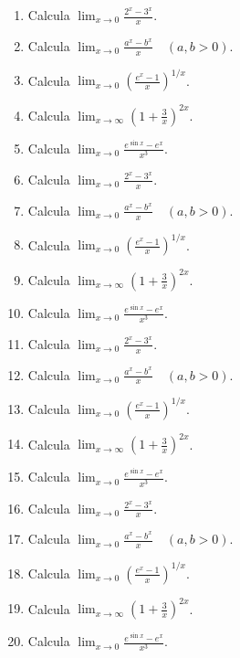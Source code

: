 \documentclass[11pt,a4paper]{article}
\begin{document}
\begin{enumerate}[label=\textbf{E\arabic*.},start=381]

\item Calcula $\displaystyle \lim_{x\to0}\frac{2^x-3^x}{x}$.

\item Calcula $\displaystyle \lim_{x\to0}\frac{a^x-b^x}{x}\quad(a,b>0)$.

\item Calcula $\displaystyle \lim_{x\to0}\left(\frac{e^x-1}{x}\right)^{1/x}$.

\item Calcula $\displaystyle \lim_{x\to\infty}\left(1+\frac{3}{x}\right)^{2x}$.

\item Calcula $\displaystyle \lim_{x\to0}\frac{e^{\sin x}-e^x}{x^3}$.

\item Calcula $\displaystyle \lim_{x\to0}\frac{2^x-3^x}{x}$.

\item Calcula $\displaystyle \lim_{x\to0}\frac{a^x-b^x}{x}\quad(a,b>0)$.

\item Calcula $\displaystyle \lim_{x\to0}\left(\frac{e^x-1}{x}\right)^{1/x}$.

\item Calcula $\displaystyle \lim_{x\to\infty}\left(1+\frac{3}{x}\right)^{2x}$.

\item Calcula $\displaystyle \lim_{x\to0}\frac{e^{\sin x}-e^x}{x^3}$.

\item Calcula $\displaystyle \lim_{x\to0}\frac{2^x-3^x}{x}$.

\item Calcula $\displaystyle \lim_{x\to0}\frac{a^x-b^x}{x}\quad(a,b>0)$.

\item Calcula $\displaystyle \lim_{x\to0}\left(\frac{e^x-1}{x}\right)^{1/x}$.

\item Calcula $\displaystyle \lim_{x\to\infty}\left(1+\frac{3}{x}\right)^{2x}$.

\item Calcula $\displaystyle \lim_{x\to0}\frac{e^{\sin x}-e^x}{x^3}$.

\item Calcula $\displaystyle \lim_{x\to0}\frac{2^x-3^x}{x}$.

\item Calcula $\displaystyle \lim_{x\to0}\frac{a^x-b^x}{x}\quad(a,b>0)$.

\item Calcula $\displaystyle \lim_{x\to0}\left(\frac{e^x-1}{x}\right)^{1/x}$.

\item Calcula $\displaystyle \lim_{x\to\infty}\left(1+\frac{3}{x}\right)^{2x}$.

\item Calcula $\displaystyle \lim_{x\to0}\frac{e^{\sin x}-e^x}{x^3}$.

\end{enumerate}
\end{document}
